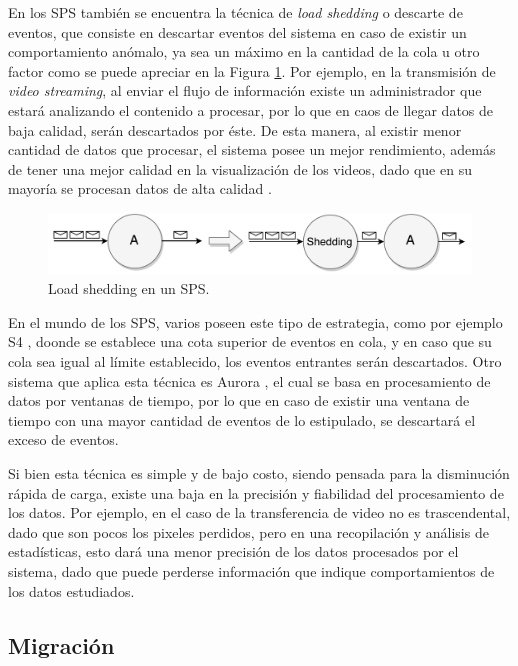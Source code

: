 En los SPS también se encuentra la técnica de \textit{load shedding} o descarte de eventos, que consiste en descartar eventos del sistema en caso de existir un comportamiento anómalo, ya sea un máximo en la cantidad de la cola u otro factor como se puede apreciar en la Figura \ref{fig:loadShedding}. Por ejemplo, en la transmisión de \textit{video streaming}, al enviar el flujo de información existe un administrador que estará analizando el contenido a procesar, por lo que en caos de llegar datos de baja calidad, serán descartados por éste. De esta manera, al existir menor cantidad de datos que procesar, el sistema posee un mejor rendimiento, además de tener una mejor calidad en la visualización de los videos, dado que en su mayoría se procesan datos de alta calidad \citep{SheuC09}. 

\begin{figure}[!ht]
	\centering
	\includegraphics[scale=0.6]{images/LoadShedding.pdf}
	\caption{Load shedding en un SPS.}
	\label{fig:loadShedding}
\end{figure}

En el mundo de los SPS, varios poseen este tipo de estrategia, como por ejemplo S4 \citep{s4}, doonde se establece una cota superior de eventos en cola, y en caso que su cola sea igual al límite establecido, los eventos entrantes serán descartados. Otro sistema que aplica esta técnica es Aurora \citep{aurora}, el cual se basa en procesamiento de datos por ventanas de tiempo, por lo que en caso de existir una ventana de tiempo con una mayor cantidad de eventos de lo estipulado, se descartará el exceso de eventos.

Si bien esta técnica es simple y de bajo costo, siendo pensada para la disminución rápida de carga, existe una baja en la precisión y fiabilidad del procesamiento de los datos. Por ejemplo, en el caso de la transferencia de video no es trascendental, dado que son pocos los pixeles perdidos, pero en una recopilación y análisis de estadísticas, esto dará una menor precisión de los datos procesados por el sistema, dado que puede perderse información que indique comportamientos de los datos estudiados.

\subsection{Migración}
\label{sec:migracionBC}

